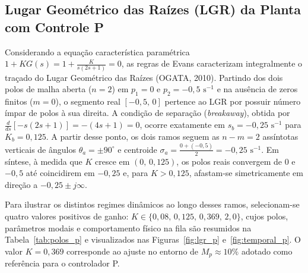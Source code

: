 \subsection{Lugar Geométrico das Raízes (LGR) da Planta com Controle P}\label{sec:lgr_p}
Considerando a equação característica paramétrica $1 + K G(s) = 1 + \frac{K}{s(2s+1)} = 0$, as regras de Evans caracterizam integralmente o traçado do Lugar Geométrico das Raízes (OGATA, 2010). Partindo dos dois polos de malha aberta ($n=2$) em $p_1 = 0$ e $p_2 = -0{,}5\text{ s}^{-1}$ e na ausência de zeros finitos ($m=0$), o segmento real $[-0{,}5,\, 0]$ pertence ao LGR por possuir número ímpar de polos à sua direita. A condição de separação (\textit{breakaway}), obtida por $\frac{d}{ds}\left[-s(2s+1)\right] = -(4s+1) = 0$, ocorre exatamente em $s_b = -0{,}25\text{ s}^{-1}$ para $K_b = 0{,}125$. A partir desse ponto, os dois ramos seguem as $n-m=2$ assíntotas verticais de ângulos $\theta_a = \pm 90^\circ$ e centroide $\sigma_a = \frac{0 + (-0{,}5)}{2} = -0{,}25\text{ s}^{-1}$. Em síntese, à medida que $K$ cresce em $(0,\,0{,}125)$, os polos reais convergem de $0$ e $-0{,}5$ até coincidirem em $-0{,}25$ e, para $K > 0{,}125$, afastam-se simetricamente em direção a $-0{,}25 \pm j\infty$.

Para ilustrar os distintos regimes dinâmicos ao longo desses ramos, selecionam-se quatro valores positivos de ganho: $K \in \{0{,}08,\, 0{,}125,\, 0{,}369,\, 2{,}0\}$, cujos polos, parâmetros modais e comportamento físico na fila são resumidos na Tabela~\ref{tab:polos_p} e visualizados nas Figuras~\ref{fig:lgr_p} e~\ref{fig:temporal_p}. O valor $K = 0{,}369$ corresponde ao ajuste no entorno de $M_p \approx 10\%$ adotado como referência para o controlador P.

\begin{table}[H]
\centering
\caption{Polos de malha fechada e comportamento dinâmico do controlador P para quatro valores de ganho $K$}
\label{tab:polos_p}
{\small\singlespacing
{}}
\end{table}

